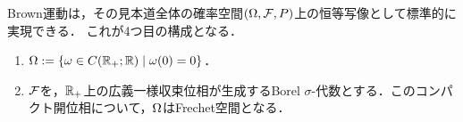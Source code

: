 \documentclass[uplatex,dvipdfmx]{jsreport}
\begin{document}
\begin{tcolorbox}[colframe=ForestGreen, colback=ForestGreen!10!white,breakable,colbacktitle=ForestGreen!40!white,coltitle=black,fonttitle=\bfseries\sffamily,
title=]
    Brown運動は，その見本道全体の確率空間$(\Omega,\mathcal{F},P)$上の恒等写像として標準的に実現できる．
    これが4つ目の構成となる．
\end{tcolorbox}

\begin{definition}\mbox{}
    \begin{enumerate}
        \item $\Omega:=\left\{\omega\in C(\mathbb{R}_+;\mathbb{R})\mid\omega(0)=0\right\}$．
        \item $\mathcal{F}$を，$\mathbb{R}_+$上の広義一様収束位相が生成するBorel $\sigma$-代数とする．このコンパクト開位相について，$\Omega$はFrechet空間となる．
    \end{enumerate}
\end{definition}
\end{document}
